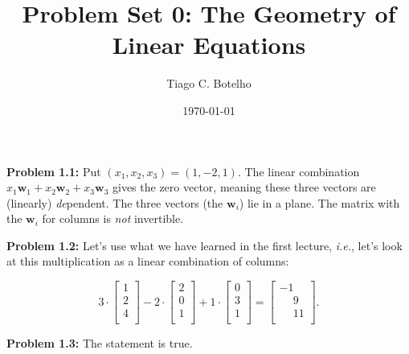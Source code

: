 \documentclass{article}
\title{Problem Set 0: The Geometry of Linear Equations}
\author{Tiago C. Botelho}
\date{\today}
\begin{document}
\maketitle

\noindent \textbf{Problem 1.1:} Put $(x_1, x_2, x_3) = (1, -2, 1)$. The linear combination $x_1 \mathbf{w}_1 + x_2 \mathbf{w}_2 + x_3 \mathbf{w}_3$ gives the zero vector, meaning these three vectors are (linearly) \textit{de}pendent. The three vectors (the $\mathbf{w}_i$) lie in a plane. The matrix with the $\mathbf{w}_i$ for columns is \textit{not} invertible.

\noindent \textbf{Problem 1.2:} Let's use what we have learned in the first lecture, \textit{i.e.}, let's look at this multiplication as a linear combination of columns:

\[
3 \cdot \begin{bmatrix}
1\\
2\\
4\\
\end{bmatrix}
-
2 \cdot \begin{bmatrix}
2\\
0\\
1\\
\end{bmatrix}
+1 \cdot \begin{bmatrix}
0\\
3\\
1\\
\end{bmatrix}
=
\begin{bmatrix}
-1\\
\phantom{-}9\\
\phantom{-}11\\
\end{bmatrix}.
\]

\noindent \textbf{Problem 1.3:} The statement is true.
\end{document}

